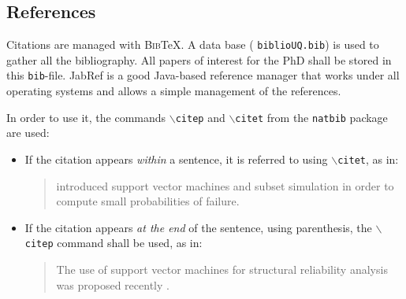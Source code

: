 \documentclass[11pt,A4]{article}
\begin{document}
\subsection{References}
Citations are managed with \textsc{Bib}\TeX. A data base (\eg
\texttt{biblioUQ.bib}) is used to gather all the bibliography. All
papers of interest for the PhD shall be stored in this
\texttt{bib}-file. JabRef is a good Java-based reference manager that
works under all operating systems and allows a simple management of the references. 

In order to use it, the commands \texttt{$\backslash$citep} and
\texttt{$\backslash$citet} from the \texttt{natbib} package are used:
\begin{itemize}
\item If the citation appears {\em within} a sentence, it is referred to
  using \texttt{$\backslash$citet}, as in: 
  \begin{quotation}
    \citet{Bourinet2011} introduced support vector machines and subset
    simulation in order to compute small probabilities of failure.
  \end{quotation}
\item If the citation appears {\em at the end} of the sentence, \ie
  using parenthesis, the \texttt{$\backslash$citep} command shall be
  used, as in:
  \begin{quotation}
    The use of support vector machines for structural reliability
    analysis was proposed recently
    \citep{Basudhar2008a,Basudhar2008b,Bourinet2011}.
  \end{quotation}
\end{itemize}


 

\renewcommand{\bibname}{References}





\label{end}
\end{document}
